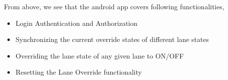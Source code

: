 From above, we see that the android app covers following functionalities,

\begin{itemize}
    \item Login Authentication and Authorization
    \item Synchronizing the current override states of different lane states
    \item Overriding the lane state of any given lane to ON/OFF
    \item Resetting the Lane Override functionality
\end{itemize}